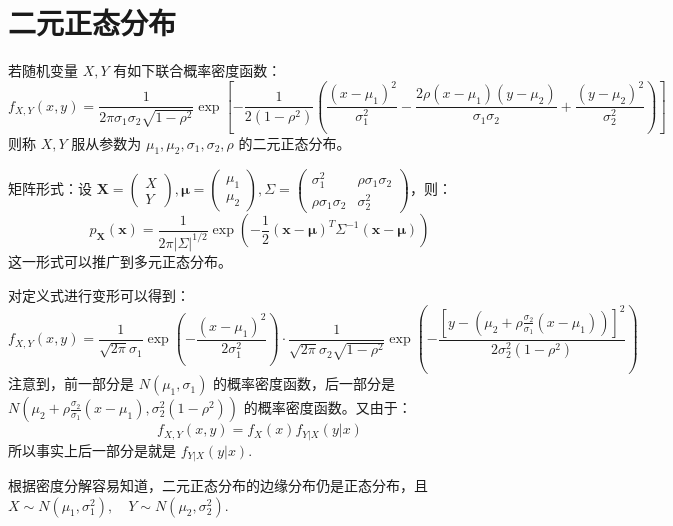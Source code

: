 \section{二元正态分布}
\label{sec:two-normal}

\begin{definition}[二元正态分布]
若随机变量 $X,Y$ 有如下联合概率密度函数：
\[
f_{X,Y}(x,y)=\frac{1}{2\pi\sigma_1\sigma_2\sqrt{1-\rho^2}}\exp\left[-\frac{1}{2(1-\rho^2)}\left(\frac{(x-\mu_1)^2}{\sigma_1^2}-\frac{2\rho(x-\mu_1)(y-\mu_2)}{\sigma_1\sigma_2}+\frac{(y-\mu_2)^2}{\sigma_2^2}\right)\right]
\]
则称 $X,Y$ 服从参数为 $\mu_1,\mu_2,\sigma_1,\sigma_2,\rho$ 的二元正态分布。
\end{definition}

\begin{com}
矩阵形式：设 $\mathbf X=\begin{pmatrix}X\\Y\end{pmatrix},\boldsymbol\mu=\begin{pmatrix}\mu_1\\\mu_2\end{pmatrix},\Sigma=\begin{pmatrix}\sigma_1^2&\rho\sigma_1\sigma_2\\\rho\sigma_1\sigma_2&\sigma_2^2\end{pmatrix}$，则：
\[
p_{\mathbf X}(\mathbf x)=\frac{1}{2\pi{|\Sigma|}^{1/2}}\exp\left(-\frac{1}{2}(\mathbf x-\boldsymbol\mu)^T\Sigma^{-1}(\mathbf x-\boldsymbol\mu)\right)
\]
这一形式可以推广到多元正态分布。
\end{com}

\begin{theorem}[二元正态分布的密度分解]
对定义式进行变形可以得到：
\[
f_{X,Y}(x,y)=\frac{1}{\sqrt{2\pi}\sigma_1}\exp\left(-\frac{(x-\mu_1)^2}{2\sigma_1^2}\right)\cdot\frac{1}{\sqrt{2\pi}\sigma_2\sqrt{1-\rho^2}}\exp\left(-\frac{\left[y-\left(\mu_2+\rho\frac{\sigma_2}{\sigma_1}(x-\mu_1)\right)\right]^2}{2\sigma_2^2(1-\rho^2)}\right)
\]
注意到，前一部分是 $N(\mu_1,\sigma_1)$ 的概率密度函数，后一部分是 $N\left(\mu_2+\rho\frac{\sigma_2}{\sigma_1}(x-\mu_1),\sigma_2^2(1-\rho^2)\right)$ 的概率密度函数。又由于：
\[
f_{X,Y}(x,y)=f_X(x)f_{Y|X}(y|x)
\]
所以事实上后一部分是就是 $f_{Y|X}(y|x)$. 
\end{theorem}

\begin{theorem}[二元正态分布的边缘分布]
根据密度分解容易知道，二元正态分布的边缘分布仍是正态分布，且 $X\sim N(\mu_1,\sigma_1^2),\quad Y\sim N(\mu_2,\sigma_2^2)$.
\end{theorem}

